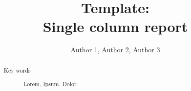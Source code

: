 
\title{Template:\\ Single column report}

\author{Author 1, Author 2, Author 3}


\begin{abstract}
\lipsum[1]

\vspace{5pt}
\begin{description}
\item[Key words]
Lorem, Ipsum, Dolor
\end{description}
\end{abstract}

\maketitle